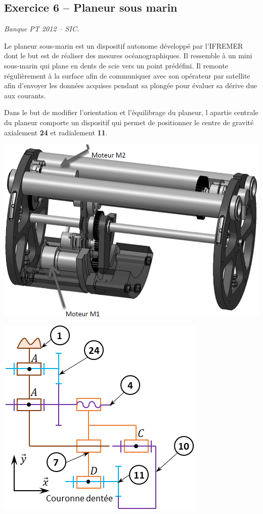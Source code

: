 \documentclass[10pt,fleqn]{article} %
\begin{document}
\begin{multicols}{2}
\subsection*{Exercice 6 -- Planeur sous marin}
\setcounter{exo}{0}
\begin{flushright}
\textit{Banque PT 2012 -- SIC.}
\end{flushright}

Le planeur sous-marin est un dispositif autonome développé par l'IFREMER dont le but est de réaliser des mesures océanographiques. Il ressemble à un mini sous-marin qui plane en dents de scie vers un point prédéfini. Il remonte régulièrement à la surface afin de communiquer avec son opérateur par satellite afin d'envoyer les données acquises pendant sa plongée pour évaluer sa dérive due aux courants. 


Dans le but de modifier l'orientation et l'équilibrage du planeur, l apartie centrale du planeur comporte un dispositif qui permet de positionner le centre de gravité axialement \textbf{24} et radialement \textbf{11}. 

\begin{center}
\includegraphics[width=.8\linewidth]{images/plan_01.png}
\end{center}

\begin{center}
\includegraphics[width=.8\linewidth]{images/plan_02.png}
\end{center}



\end{multicols}
\end{document}
